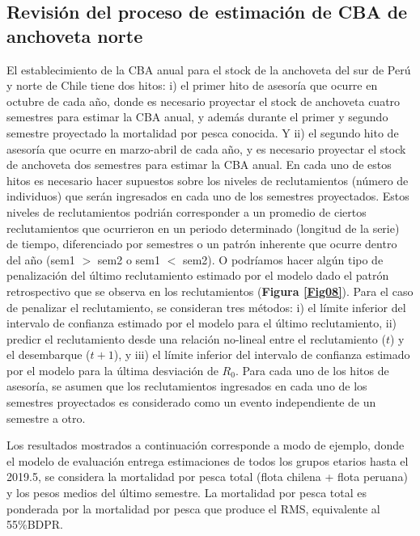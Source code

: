 \documentclass[letter,11pt]{article}
\begin{document}
\subsection{Revisi\'on del proceso de estimaci\'on de CBA de anchoveta norte}

\quad

El establecimiento de la CBA anual para el stock de la anchoveta
del sur de Per\'u y norte de Chile tiene dos hitos: i) el primer hito de
asesor\'ia que ocurre en octubre de cada a\~{n}o, donde es necesario proyectar el
stock de anchoveta cuatro semestres para estimar la CBA anual, y adem\'as durante el
primer y segundo semestre proyectado la mortalidad por pesca conocida. 
Y ii) el segundo hito de asesor\'ia que ocurre en marzo-abril de cada
a\~{n}o, y es necesario proyectar el stock de anchoveta dos semestres para
estimar la CBA anual. En cada uno de estos hitos es
necesario hacer supuestos sobre los niveles de reclutamientos (n\'umero de
individuos) que ser\'an ingresados en cada uno de los semestres
proyectados. Estos niveles de reclutamientos podri\'an
corresponder a un promedio de ciertos reclutamientos que ocurrieron en
un periodo determinado (longitud de la serie) de tiempo, diferenciado por
semestres o un patr\'on inherente que ocurre dentro del a\~{n}o (sem1 $>$
sem2 o sem1 $<$ sem2). O podr\'iamos hacer alg\'un tipo de penalizaci\'on
del \'ultimo reclutamiento estimado por el modelo dado el patr\'on retrospectivo
que se observa en los reclutamientos (\textbf{Figura \ref{Fig08}}).
Para el caso de penalizar el reclutamiento, se consideran tres m\'etodos: i) el l\'imite inferior
del intervalo de confianza estimado por el modelo para el \'ultimo reclutamiento,
ii) predicr el reclutamiento desde una relaci\'on no-lineal entre el reclutamiento
($t$) y el desembarque ($t+1$), y iii) el l\'imite inferior del intervalo de confianza
estimado por el modelo para la \'ultima desviaci\'on de $R_{0}$. Para cada uno de los
hitos de asesor\'ia, se asumen que los reclutamientos ingresados en cada uno de los semestres
proyectados es considerado como un evento independiente de un semestre a otro.

Los resultados mostrados a continuaci\'on corresponde a modo de ejemplo,
donde el modelo de evaluaci\'on entrega estimaciones de todos los grupos
etarios hasta el 2019.5, se considera la mortalidad por pesca total
(flota chilena + flota peruana) y los pesos medios del \'ultimo semestre.
La mortalidad por pesca total es ponderada por la mortalidad por pesca
que produce el RMS, equivalente al 55\%BDPR.
\end{document}
